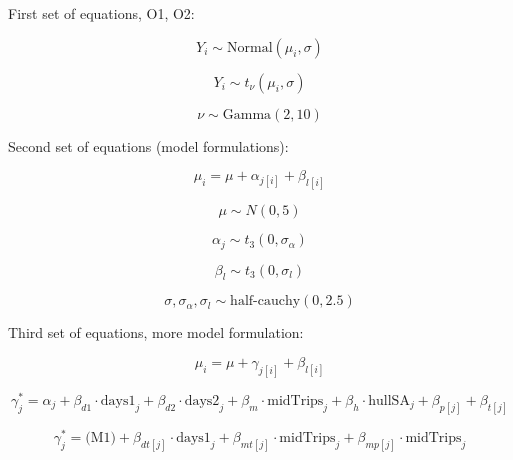 \documentclass[a4paper,12pt]{article}
\begin{document}
First set of equations, O1, O2:

\[ Y_{i} \sim \text{Normal}(\mu_{i}, \sigma) \]

\[ Y_{i} \sim t_{\nu}(\mu_{i}, \sigma) \]

\[ \nu \sim \text{Gamma}(2, 10) \]

Second set of equations (model formulations):

\[ \mu_{i} = \mu + \alpha_{j[i]} + \beta_{l[i]} \]

\[\mu \sim N(0, 5) \]

\[ \alpha_{j} \sim t_{3}(0, \sigma_{\alpha}) \]

\[ \beta_{l} \sim t_{3}(0, \sigma_{l}) \]

\[ \sigma,\sigma_{\alpha},\sigma_{l} \sim \text{half-cauchy}(0, 2.5) \]

Third set of equations, more model formulation:

\[ \mu_{i} = \mu + \gamma_{j[i]} + \beta_{l[i]} \]

\[ \gamma_{j}^{*} = \alpha_{j} + \beta_{d1} \cdot \text{days1}_{j} + \beta_{d2} \cdot \text{days2}_{j} + \beta_{m} \cdot \text{midTrips}_{j} + \beta_{h} \cdot \text{hullSA}_{j} + \beta_{p[j]} + \beta_{t[j]} \]

\[ \gamma^{*}_{j} = \text{(M1)} + \beta_{dt[j]} \cdot \text{days1}_{j} + \beta_{mt[j]} \cdot \text{midTrips}_{j} + \beta_{mp[j]} \cdot \text{midTrips}_{j} \]
\end{document}
